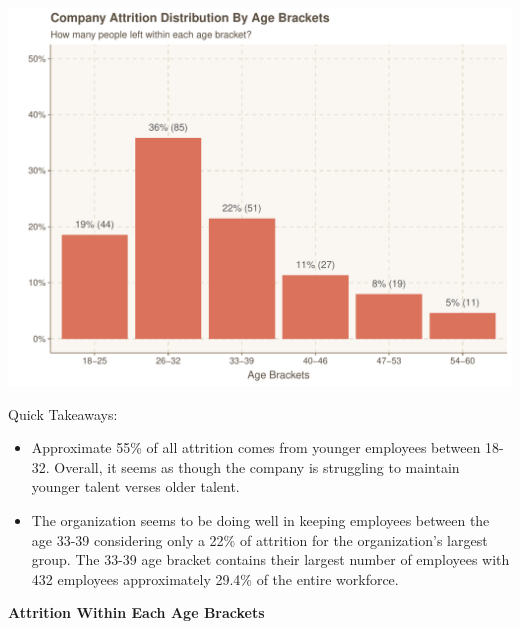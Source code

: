 \documentclass[
]{article}
\providecommand{\tightlist}{%
  \setlength{\itemsep}{0pt}\setlength{\parskip}{0pt}}
\begin{document}
\includegraphics{figures/Attrition Distribtuion by Age Brackets-1.pdf}

Quick Takeaways:

\begin{itemize}
\tightlist
\item
  Approximate 55\% of all attrition comes from younger employees between
  18-32. Overall, it seems as though the company is struggling to
  maintain younger talent verses older talent.
\item
  The organization seems to be doing well in keeping employees between
  the age 33-39 considering only a 22\% of attrition for the
  organization's largest group. The 33-39 age bracket contains their
  largest number of employees with 432 employees approximately 29.4\% of
  the entire workforce.
\end{itemize}

\textbf{Attrition Within Each Age Brackets}
\end{document}
